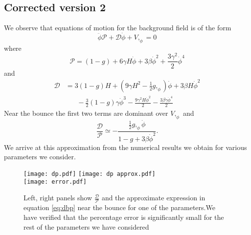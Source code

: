 \documentclass[12pt,a4paper]{article}
\author{}
\numberwithin{equation}{section}
\numberwithin{equation}{section}
\begin{document}
\title{}
\maketitle
\subsection{Corrected version 2}
We observe that equations of motion for the background field is of the form \cite{Cai:2012va}
\begin{equation}
    \ddot{\phi} \mathcal{P} + \mathcal{D} \dot{\phi} + V,_{\phi} = 0
    \label{eq:eom}
\end{equation}
where
\begin{equation}
  \mathcal{P} = (1-g) + 6 \gamma H \dot{\phi} + 3 \beta \dot{\phi}^2 + \frac{3 \gamma^2}{2} \dot{\phi}^4
  \label{eq:p}
\end{equation}
and
\begin{equation}
\begin{split}
    \mathcal{D} & = 3 (1-g) H +(9 \gamma H^2-\frac{1}{2} g,_{\phi}) \dot{\phi} + 3 \beta H \dot{\phi}^2 \\
    &\;\;\;\;\;\;-\frac{3}{2} (1-g) \gamma \dot{\phi}^3 -\frac{9 \gamma^2 H \dot{\phi}^2}{2} -\frac{3 \beta \gamma \dot{\phi}^4 }{2}
    \end{split}
    \label{eq:d}
\end{equation}
Near the bounce the first two terms are dominant over $V,_{\phi}$ and 
\begin{equation}
    \frac{\mathcal{D}}{\mathcal{P}} \simeq -\frac{\frac{1}{2} g,_{\phi} \dot{\phi}}{  {1-g + 3 \beta \dot{\phi}^2  }}. 
    \label{eq:dbp}
\end{equation}
We arrive at this approximation from the numerical results we obtain for various parameters we consider.
\begin{figure}[H]
    \centering
    \texttt{[image: dp.pdf]} 
    \hspace{0.5cm}
     \texttt{[image: dp approx.pdf]} 
     \\
      \texttt{[image: error.pdf]} 
     \caption{Left,  right panels show $\frac{\mathcal{D}}{\mathcal{P}}$ and the approximate expression in equation \eqref{eq:dbp} near the bounce for one of the parameters.We have verified that the percentage error is significantly small for the rest of the parameters we have considered } 
 \label{fig:dp approx}
\end{figure}    
\end{document}
